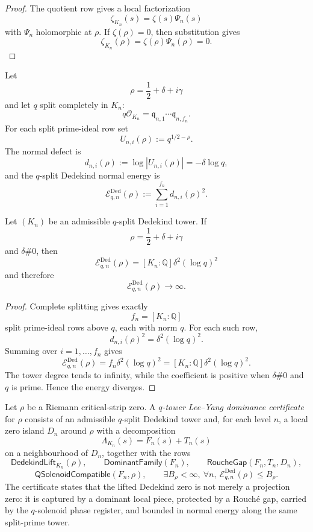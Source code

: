 \begin{proof}
The quotient row gives a local factorization
$$
\zeta_{K_n}(s)=\zeta(s)\Psi_n(s)
$$
with $\Psi_n$ holomorphic at $\rho$.  If $\zeta(\rho)=0$, then
substitution gives
$$
\zeta_{K_n}(\rho)=\zeta(\rho)\Psi_n(\rho)=0.
$$
\end{proof}

\begin{definition}
\label{def:unified-reality-q-split-dedekind-normal-energy}
Let
$$
\rho=\frac12+\delta+i\gamma
$$
and let $q$ split completely in $K_n$:
$$
q\mathcal O_{K_n}
=
\mathfrak q_{n,1}\cdots \mathfrak q_{n,f_n}.
$$
For each split prime-ideal row set
$$
U_{n,i}(\rho):=q^{1/2-\rho}.
$$
The normal defect is
$$
d_{n,i}(\rho):=\log |U_{n,i}(\rho)|=-\delta\log q,
$$
and the $q$-split Dedekind normal energy is
$$
\mathcal E^{\mathrm{Ded}}_{q,n}(\rho)
:=
\sum_{i=1}^{f_n}d_{n,i}(\rho)^2.
$$
\end{definition}

\begin{theorem}
\label{thm:unified-reality-dedekind-split-counts-amplify-off-half-energy}
Let $(K_n)$ be an admissible $q$-split Dedekind tower.  If
$$
\rho=\frac12+\delta+i\gamma
$$
and $\delta\#0$, then
$$
\mathcal E^{\mathrm{Ded}}_{q,n}(\rho)
=
[K_n:\mathbb Q]\delta^2(\log q)^2
$$
and therefore
$$
\mathcal E^{\mathrm{Ded}}_{q,n}(\rho)\to\infty.
$$
\end{theorem}

\begin{proof}
Complete splitting gives exactly
$$
f_n=[K_n:\mathbb Q]
$$
split prime-ideal rows above $q$, each with norm $q$.  For each such row,
$$
d_{n,i}(\rho)^2=\delta^2(\log q)^2.
$$
Summing over $i=1,\ldots,f_n$ gives
$$
\mathcal E^{\mathrm{Ded}}_{q,n}(\rho)
=
f_n\delta^2(\log q)^2
=
[K_n:\mathbb Q]\delta^2(\log q)^2.
$$
The tower degree tends to infinity, while the coefficient is positive
when $\delta\#0$ and $q$ is prime.  Hence the energy diverges.
\end{proof}

\begin{definition}
\label{def:unified-reality-q-tower-lee-yang-dominance-certificate}
Let $\rho$ be a Riemann critical-strip zero.  A \emph{$q$-tower
Lee--Yang dominance certificate} for $\rho$ consists of an admissible
$q$-split Dedekind tower and, for each level $n$, a local zero island
$D_n$ around $\rho$ with a decomposition
$$
\Lambda_{K_n}(s)=F_n(s)+T_n(s)
$$
on a neighbourhood of $D_n$, together with the rows
$$
\mathsf{DedekindLift}_{K_n}(\rho),
\qquad
\mathsf{DominantFamily}(F_n),
\qquad
\mathsf{RoucheGap}(F_n,T_n,D_n),
$$
$$
\mathsf{QSolenoidCompatible}(F_n,\rho),
\qquad
\exists B_{\rho}<\infty,\ \forall n,\
\mathcal E^{\mathrm{Ded}}_{q,n}(\rho)\le B_{\rho}.
$$
The certificate states that the lifted Dedekind zero is not merely a
projection zero: it is captured by a dominant local piece, protected by
a Rouch\'e gap, carried by the $q$-solenoid phase register, and bounded
in normal energy along the same split-prime tower.
\end{definition}

